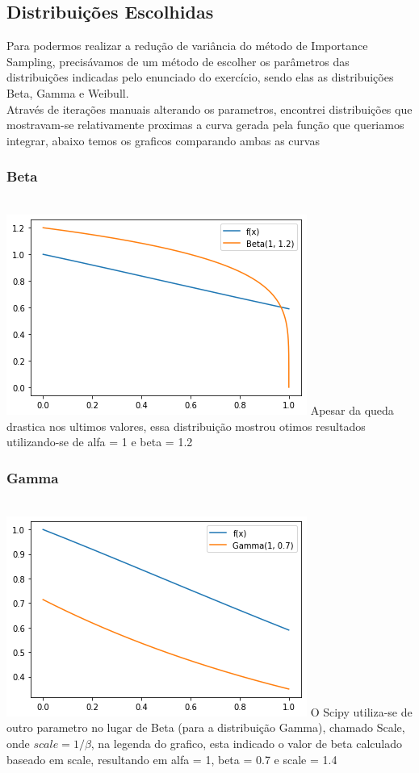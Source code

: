 \documentclass[twocolumn,amsmath,amssymb,floatfix]{revtex4}
\begin{document}
\subsection{Distribuições Escolhidas}
\indent Para podermos realizar a redução de variância do método de Importance Sampling, precisávamos de um método de escolher os parâmetros das distribuições indicadas pelo enunciado do exercício, sendo elas as distribuições Beta, Gamma e Weibull.\\
\indent Através de iterações manuais alterando os parametros, encontrei distribuições que mostravam-se relativamente proximas a curva gerada pela função que queriamos integrar, abaixo temos os graficos comparando ambas as curvas
\subsubsection{Beta}
\\\includegraphics[scale=0.65]{beta_dist_graph.png}
\indent Apesar da queda drastica nos ultimos valores, essa distribuição mostrou otimos resultados utilizando-se de alfa = 1 e beta = 1.2
\subsubsection{Gamma}
\\\includegraphics[scale=0.65]{gamma_dist_graph.png}
\indent O Scipy utiliza-se de outro parametro no lugar de Beta (para a distribuição Gamma), chamado Scale, onde
$scale = 1/\beta$, na legenda do grafico, esta indicado o valor de beta calculado baseado em scale, resultando em alfa = 1, beta = 0.7 e scale = 1.4
\end{document}
